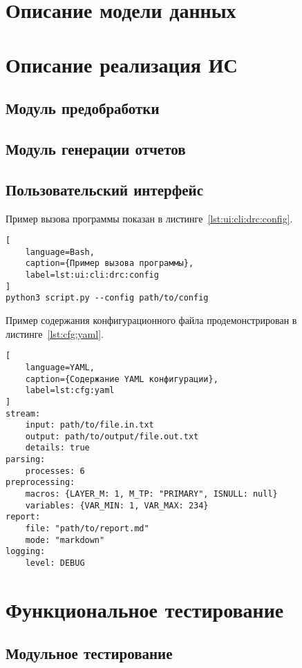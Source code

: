 \section{Описание модели данных}

\section{Описание реализация ИС}

\subsection{Модуль предобработки}

\subsection{Модуль генерации отчетов}

\subsection{Пользовательский интерфейс}

Пример вызова программы показан в листинге~\ref{lst:ui:cli:drc:config}.

\begin{lstlisting}[
	language=Bash,
	caption={Пример вызова программы},
	label=lst:ui:cli:drc:config
]
python3 script.py --config path/to/config
\end{lstlisting}

Пример содержания конфигурационного файла продемонстрирован
в листинге~\ref{lst:cfg:yaml}.

\begin{lstlisting}[
	language=YAML,
	caption={Содержание YAML конфигурации},
	label=lst:cfg:yaml
]
stream:
	input: path/to/file.in.txt
	output: path/to/output/file.out.txt
	details: true
parsing:
	processes: 6
preprocessing:
	macros: {LAYER_M: 1, M_TP: "PRIMARY", ISNULL: null}
	variables: {VAR_MIN: 1, VAR_MAX: 234}
report:
	file: "path/to/report.md"
	mode: "markdown"
logging:
	level: DEBUG
\end{lstlisting}

\section{Функциональное тестирование}

\subsection{Модульное тестирование}

